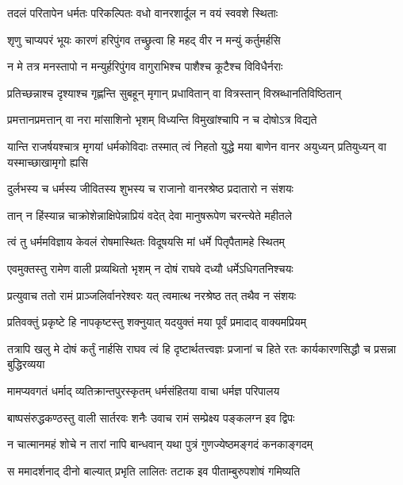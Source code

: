 \twolineshloka
{तदलं परितापेन धर्मतः परिकल्पितः}
{वधो वानरशार्दूल न वयं स्ववशे स्थिताः} %

\twolineshloka
{शृणु चाप्यपरं भूयः कारणं हरिपुंगव}
{तच्छ्रुत्वा हि महद् वीर न मन्युं कर्तुमर्हसि} %

\twolineshloka
{न मे तत्र मनस्तापो न मन्युर्हरिपुंगव}
{वागुराभिश्च पाशैश्च कूटैश्च विविधैर्नराः} %

\twolineshloka
{प्रतिच्छन्नाश्च दृश्याश्च गृह्णन्ति सुबहून् मृगान्}
{प्रधावितान् वा वित्रस्तान् विस्रब्धानतिविष्ठितान्} %

\twolineshloka
{प्रमत्तानप्रमत्तान् वा नरा मांसाशिनो भृशम्}
{विध्यन्ति विमुखांश्चापि न च दोषोऽत्र विद्यते} %

\threelineshloka
{यान्ति राजर्षयश्चात्र मृगयां धर्मकोविदाः}
{तस्मात् त्वं निहतो युद्धे मया बाणेन वानर}
{अयुध्यन् प्रतियुध्यन् वा यस्माच्छाखामृगो ह्यसि} %

\twolineshloka
{दुर्लभस्य च धर्मस्य जीवितस्य शुभस्य च}
{राजानो वानरश्रेष्ठ प्रदातारो न संशयः} %

\twolineshloka
{तान् न हिंस्यान्न चाक्रोशेन्नाक्षिपेन्नाप्रियं वदेत्}
{देवा मानुषरूपेण चरन्त्येते महीतले} %

\twolineshloka
{त्वं तु धर्ममविज्ञाय केवलं रोषमास्थितः}
{विदूषयसि मां धर्मे पितृपैतामहे स्थितम्} %

\twolineshloka
{एवमुक्तस्तु रामेण वाली प्रव्यथितो भृशम्}
{न दोषं राघवे दध्यौ धर्मेऽधिगतनिश्चयः} %

\twolineshloka
{प्रत्युवाच ततो रामं प्राञ्जलिर्वानरेश्वरः}
{यत् त्वमात्थ नरश्रेष्ठ तत् तथैव न संशयः} %

\twolineshloka
{प्रतिवक्तुं प्रकृष्टे हि नापकृष्टस्तु शक्नुयात्}
{यदयुक्तं मया पूर्वं प्रमादाद् वाक्यमप्रियम्} %

\threelineshloka
{तत्रापि खलु मे दोषं कर्तुं नार्हसि राघव}
{त्वं हि दृष्टार्थतत्त्वज्ञः प्रजानां च हिते रतः}
{कार्यकारणसिद्धौ च प्रसन्ना बुद्धिरव्यया} %

\twolineshloka
{मामप्यवगतं धर्माद् व्यतिक्रान्तपुरस्कृतम्}
{धर्मसंहितया वाचा धर्मज्ञ परिपालय} %

\twolineshloka
{बाष्पसंरुद्धकण्ठस्तु वाली सार्तरवः शनैः}
{उवाच रामं सम्प्रेक्ष्य पङ्कलग्न इव द्विपः} %

\twolineshloka
{न चात्मानमहं शोचे न तारां नापि बान्धवान्}
{यथा पुत्रं गुणज्येष्ठमङ्गदं कनकाङ्गदम्} %

\twolineshloka
{स ममादर्शनाद् दीनो बाल्यात् प्रभृति लालितः}
{तटाक इव पीताम्बुरुपशोषं गमिष्यति} %

